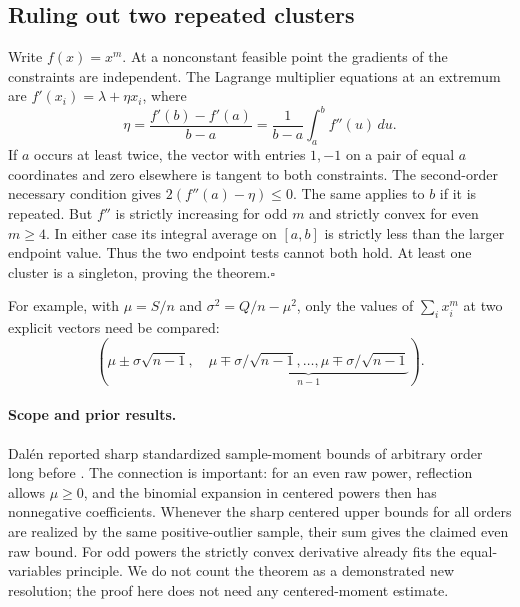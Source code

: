 \documentclass[11pt,a4paper]{article}
\numberwithin{equation}{section}
\theoremstyle{definition}
\theoremstyle{remark}
\begin{document}
\subsection{Ruling out two repeated clusters}
Write $f(x)=x^m$. At a nonconstant feasible point the gradients of the constraints are independent. The Lagrange multiplier equations at an extremum are $f'(x_i)=\lambda+\eta x_i$, where
\[
 \eta=\frac{f'(b)-f'(a)}{b-a}=\frac{1}{b-a}\int_a^b f''(u)\,du.
\]
If $a$ occurs at least twice, the vector with entries $1,-1$ on a pair of equal $a$ coordinates and zero elsewhere is tangent to both constraints. The second-order necessary condition gives $2(f''(a)-\eta)\le0$. The same applies to $b$ if it is repeated. But $f''$ is strictly increasing for odd $m$ and strictly convex for even $m\ge4$. In either case its integral average on $[a,b]$ is strictly less than the larger endpoint value. Thus the two endpoint tests cannot both hold. At least one cluster is a singleton, proving the theorem.\hfill$\square$

For example, with $\mu=S/n$ and $\sigma^2=Q/n-\mu^2$, only the values of $\sum_i x_i^m$ at two explicit vectors need be compared:
\[
 \left(\mu\pm\sigma\sqrt{n-1},\quad
       \underbrace{\mu\mp\sigma/\sqrt{n-1},\ldots,\mu\mp\sigma/\sqrt{n-1}}_{n-1}\right).
\]

\paragraph{Scope and prior results.}
Dal\'en \cite{r31keio:d} reported sharp standardized sample-moment bounds of arbitrary order long before \cite{r31keio:c}. The connection is important: for an even raw power, reflection allows $\mu\ge0$, and the binomial expansion in centered powers then has nonnegative coefficients. Whenever the sharp centered upper bounds for all orders are realized by the same positive-outlier sample, their sum gives the claimed even raw bound. For odd powers the strictly convex derivative already fits the equal-variables principle. We do not count the theorem as a demonstrated new resolution; the proof here does not need any centered-moment estimate.
\end{document}
